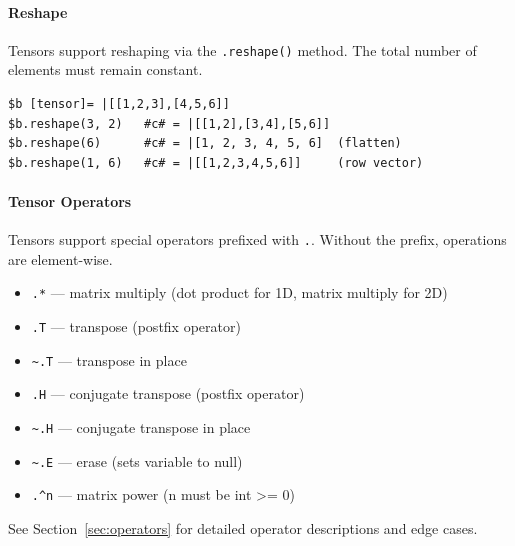 \paragraph{Reshape}
Tensors support reshaping via the \texttt{.reshape()} method. The total number of elements must remain constant.
\begin{verbatim}
$b [tensor]= |[[1,2,3],[4,5,6]]
$b.reshape(3, 2)   #c# = |[[1,2],[3,4],[5,6]]
$b.reshape(6)      #c# = |[1, 2, 3, 4, 5, 6]  (flatten)
$b.reshape(1, 6)   #c# = |[[1,2,3,4,5,6]]     (row vector)
\end{verbatim}

\paragraph{Tensor Operators}
Tensors support special operators prefixed with \texttt{.}. Without the prefix, operations are element-wise.
\begin{itemize}
\item \texttt{.*} — matrix multiply (dot product for 1D, matrix multiply for 2D)
\item \texttt{.T} — transpose (postfix operator)
\item \texttt{\textasciitilde.T} — transpose in place
\item \texttt{.H} — conjugate transpose (postfix operator)
\item \texttt{\textasciitilde.H} — conjugate transpose in place
\item \texttt{\textasciitilde.E} — erase (sets variable to null)
\item \texttt{.\^{}n} — matrix power (n must be int >= 0)
\end{itemize}
See Section~\ref{sec:operators} for detailed operator descriptions and edge cases.

